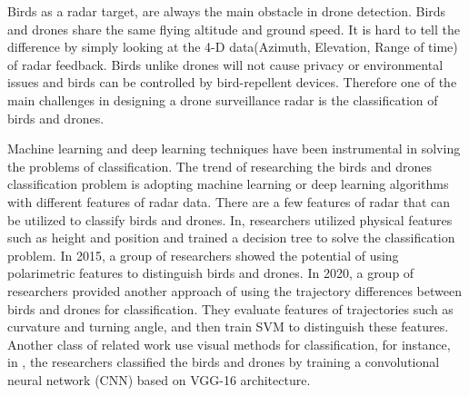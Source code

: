 \documentclass{cta-author}
\begin{document}
Birds as a radar target, are always the main obstacle in drone detection. Birds and drones share the same flying altitude and ground speed. It is hard to tell the difference by simply looking at the 4-D data(Azimuth, Elevation, Range of time) of radar feedback. Birds unlike drones will not cause privacy or environmental issues and birds can be controlled by bird-repellent devices. Therefore one of the main challenges in designing a drone surveillance radar is the classification of birds and drones.

Machine learning and deep learning techniques have been instrumental in solving the problems of classification. The trend of researching the birds and drones classification problem is adopting machine learning or deep learning algorithms with different features of radar data.
There are a few features of radar that can be utilized to classify birds and drones. 
In\cite{2}, researchers utilized physical features such as height and position and trained a decision tree to solve the classification problem.
In 2015, a group of researchers showed the potential of using polarimetric features to distinguish birds and drones.\cite{3} 
In 2020, a group of researchers provided another approach of using the trajectory differences between birds and drones for classification.\cite{4} They evaluate features of trajectories such as curvature and turning angle, and then train SVM to distinguish these features. 
Another class of related work use visual methods for classification, for instance, in \cite{5}, the researchers classified the birds and drones by training a convolutional neural network (CNN) based on VGG-16 architecture. 
\end{document}
